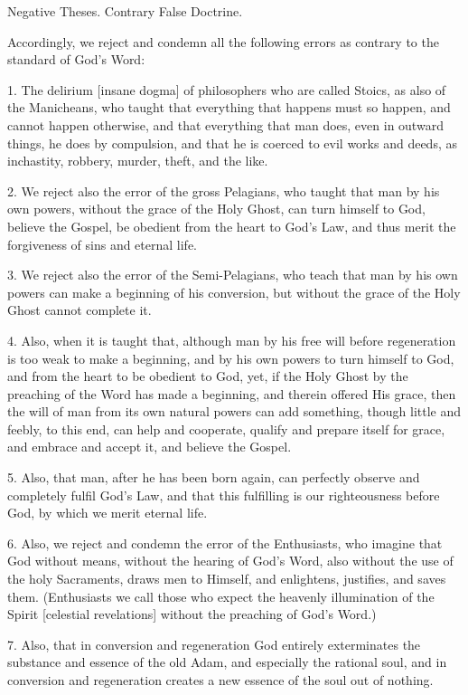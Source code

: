 Negative Theses.
Contrary False Doctrine.

Accordingly, we reject and condemn all the following errors as contrary to the standard of God's Word:

1. The delirium [insane dogma] of philosophers who are called Stoics, as also of the Manicheans, who taught that everything that happens must so happen, and cannot happen otherwise, and that everything that man does, even in outward things, he does by compulsion, and that he is coerced to evil works and deeds, as inchastity, robbery, murder, theft, and the like.

2. We reject also the error of the gross Pelagians, who taught that man by his own powers, without the grace of the Holy Ghost, can turn himself to God, believe the Gospel, be obedient from the heart to God's Law, and thus merit the forgiveness of sins and eternal life.

3. We reject also the error of the Semi-Pelagians, who teach that man by his own powers can make a beginning of his conversion, but without the grace of the Holy Ghost cannot complete it.

4. Also, when it is taught that, although man by his free will before regeneration is too weak to make a beginning, and by his own powers to turn himself to God, and from the heart to be obedient to God, yet, if the Holy Ghost by the preaching of the Word has made a beginning, and therein offered His grace, then the will of man from its own natural powers can add something, though little and feebly, to this end, can help and cooperate, qualify and prepare itself for grace, and embrace and accept it, and believe the Gospel.

5. Also, that man, after he has been born again, can perfectly observe and completely fulfil God's Law, and that this fulfilling is our righteousness before God, by which we merit eternal life.

6. Also, we reject and condemn the error of the Enthusiasts, who imagine that God without means, without the hearing of God's Word, also without the use of the holy Sacraments, draws men to Himself, and enlightens, justifies, and saves them. (Enthusiasts we call those who expect the heavenly illumination of the Spirit [celestial revelations] without the preaching of God's Word.)

7. Also, that in conversion and regeneration God entirely exterminates the substance and essence of the old Adam, and especially the rational soul, and in conversion and regeneration creates a new essence of the soul out of nothing.

